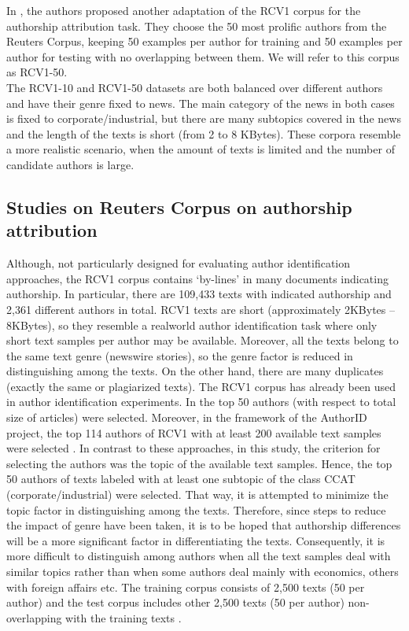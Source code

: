 In \citet{houvardas2006n}, the authors proposed another adaptation of the RCV1 corpus for the authorship attribution task. They choose the 50 most prolific authors from the Reuters Corpus, keeping 50 examples per author for training and 50 examples per author for testing with no
overlapping between them. We will refer to this corpus as RCV1-50.\\
The RCV1-10 and RCV1-50 datasets are both balanced over different authors and have their genre fixed to news.
The main category of the news in both cases is fixed to corporate/industrial, but there are many subtopics covered in the news and the length of the texts is short (from 2 to 8 KBytes). These corpora resemble a more realistic scenario, when the amount of texts is limited and the number of candidate authors is large.

\subsection{Studies on Reuters Corpus on authorship attribution}

Although, not particularly designed for evaluating author identification approaches, the RCV1
corpus contains ‘by-lines’ in many documents indicating authorship. In particular,
there are 109,433 texts with indicated authorship and 2,361 different authors in total.
RCV1 texts are short (approximately 2KBytes – 8KBytes), so they resemble a realworld author identification task where only short text samples per author may be available. Moreover, all the texts belong to the same text genre (newswire stories), so
the genre factor is reduced in distinguishing among the texts. On the other hand, there
are many duplicates (exactly the same or plagiarized texts).
The RCV1 corpus has already been used in author identification experiments. In
\citet{khmelev2003repetition} the top 50 authors (with respect to total size of articles) were selected. Moreover, in the framework of the AuthorID project, the top 114 authors of RCV1 with at least 200 available text samples were selected \cite{madigan2005author}. In contrast to these approaches, in this study, the criterion for selecting the authors was the topic of the available text
samples. Hence, the top 50 authors of texts labeled with at least one subtopic of the class CCAT (corporate/industrial) were selected. That way, it is attempted to minimize the topic factor in distinguishing among the texts. Therefore, since steps to reduce the impact of genre have been taken, it is to be hoped that authorship differences will be a more significant factor in differentiating the texts. Consequently, it is more difficult to distinguish among authors when all the text samples deal with similar topics rather than when some authors deal mainly with economics, others with foreign affairs etc.
The training corpus consists of 2,500 texts (50 per author) and the test corpus includes
other 2,500 texts (50 per author) non-overlapping with the training texts \cite{houvardas2006n}.

